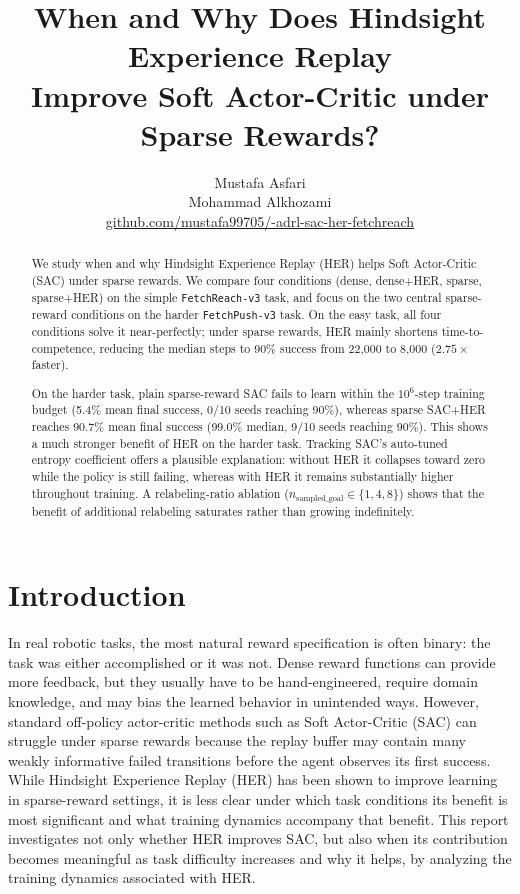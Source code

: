 \documentclass{article}
\title{When and Why Does Hindsight Experience Replay\\
Improve Soft Actor-Critic under Sparse Rewards?}
\author{Mustafa Asfari \\ Mohammad Alkhozami \\
\url{github.com/mustafa99705/-adrl-sac-her-fetchreach}}
\begin{document}
\maketitle

\begin{abstract}
We study when and why Hindsight Experience Replay (HER) helps
Soft Actor-Critic (SAC) under sparse rewards. We compare four conditions
(dense, dense+HER, sparse, sparse+HER) on the simple
\texttt{FetchReach-v3} task, and focus on the two central sparse-reward
conditions on the harder \texttt{FetchPush-v3} task. On the easy task, all
four conditions solve it near-perfectly; under sparse rewards, HER mainly
shortens time-to-competence, reducing the median steps to 90\% success from
22,000 to 8,000 ($2.75\times$ faster).

On the harder task, plain sparse-reward SAC fails to learn within the
$10^6$-step training budget (5.4\% mean final success, 0/10 seeds reaching
90\%), whereas sparse SAC+HER reaches 90.7\% mean final success (99.0\%
median, 9/10 seeds reaching 90\%). This shows a much stronger benefit of HER
on the harder task. Tracking SAC's auto-tuned entropy coefficient offers a
plausible explanation: without HER it collapses toward zero while the policy
is still failing, whereas with HER it remains substantially higher throughout
training. A relabeling-ratio ablation
($n_{\text{sampled\_goal}} \in \{1,4,8\}$) shows that the benefit of
additional relabeling saturates rather than growing indefinitely.
\end{abstract}

\section{Introduction}

In real robotic tasks, the most natural reward specification is often binary:
the task was either accomplished or it was not. Dense reward functions can
provide more feedback, but they usually have to be hand-engineered, require
domain knowledge, and may bias the learned behavior in unintended ways.
However, standard off-policy actor-critic methods such as Soft Actor-Critic
(SAC) can struggle under sparse rewards because the replay buffer may contain
many weakly informative failed transitions before the agent observes its first
success. While Hindsight Experience Replay (HER) has been shown to improve
learning in sparse-reward settings, it is less clear under which task conditions
its benefit is most significant and what training dynamics accompany that
benefit. This report investigates not only whether HER improves SAC, but also
when its contribution becomes meaningful as task difficulty increases and why
it helps, by analyzing the training dynamics associated with HER.
\end{document}
